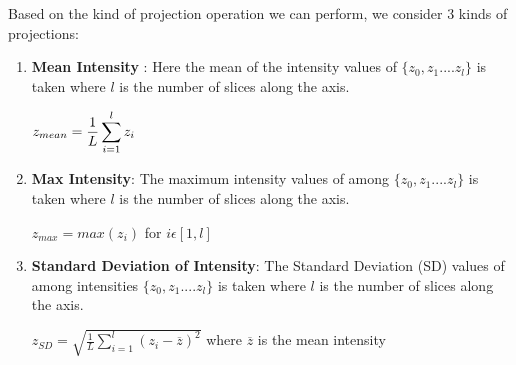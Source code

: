 Based on the kind of projection operation we can perform, we consider 3 kinds of projections:
\begin{enumerate}
    \item \textbf{Mean Intensity} : Here the mean of the intensity values of $\{z_0,z_1....z_l\}$ is taken where $l$ is the number of slices along the axis. 
    \vspace*{1mm}
    \begin{center}
       $ z_{mean}=\displaystyle\frac{1}{L}\displaystyle\Large\sum\limits_{i=1}^l z_i $
    \end{center}
    \vspace*{1mm}
    \item \textbf{Max Intensity}: The maximum intensity values of among $\{z_0,z_1....z_l\}$ is taken where $l$ is the number of slices along the axis.
    \vspace*{1mm}
    \begin{center}
       $ z_{max}=\displaystyle max(z_i) $ for $i\epsilon[1,l]$
    \end{center}
    \vspace*{1mm}
    \item \textbf{Standard Deviation of Intensity}: The Standard Deviation (SD) values of among intensities $\{z_0,z_1....z_l\}$ is taken where $l$ is the number of slices along the axis.
    \vspace*{1mm}
    \begin{center}
       $ z_{SD} = \displaystyle\sqrt{\frac{1}{L} \sum_{i=1}^l (z_i - \overline{z})^2}$ where $\overline{z}$ is the mean intensity
    \end{center}
    \vspace*{1mm}
\end{enumerate}
 \vspace*{2mm}

